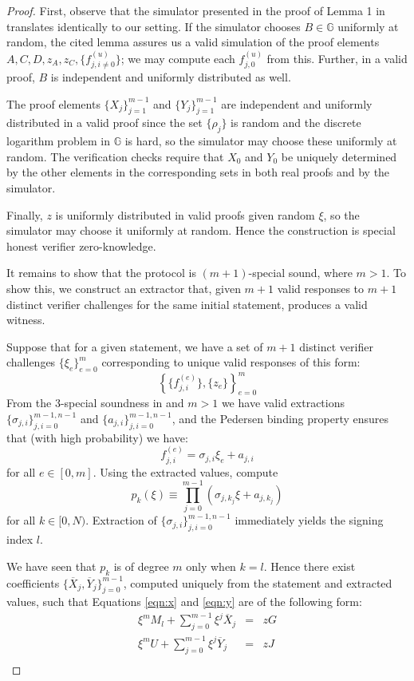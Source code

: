 \documentclass{article}
\newcommand{\G}{\mathbb{G}}
\newcommand{\sumj}{\sum_{j=0}^{m-1}}
\theoremstyle{definition}
\begin{document}
\begin{proof}
First, observe that the simulator presented in the proof of Lemma 1 in \cite{bootle} translates identically to our setting.
If the simulator chooses $B \in \G$ uniformly at random, the cited lemma assures us a valid simulation of the proof elements $A,C,D,z_A,z_C,\{f^{(u)}_{j,i \neq 0}\}$; we may compute each $f^{(u)}_{j,0}$ from this.
Further, in a valid proof, $B$ is independent and uniformly distributed as well.

The proof elements $\{X_j\}_{j=1}^{m-1}$ and $\{Y_j\}_{j=1}^{m-1}$ are independent and uniformly distributed in a valid proof since the set $\{\rho_j\}$ is random and the discrete logarithm problem in $\G$ is hard, so the simulator may choose these uniformly at random.
The verification checks require that $X_0$ and $Y_0$ be uniquely determined by the other elements in the corresponding sets in both real proofs and by the simulator.

Finally, $z$ is uniformly distributed in valid proofs given random $\xi$, so the simulator may choose it uniformly at random.
Hence the construction is special honest verifier zero-knowledge.

It remains to show that the protocol is $(m+1)$-special sound, where $m > 1$.
To show this, we construct an extractor that, given $m+1$ valid responses to $m+1$ distinct verifier challenges for the same initial statement, produces a valid witness.

Suppose that for a given statement, we have a set of $m+1$ distinct verifier challenges $\{\xi_e\}_{e=0}^m$ corresponding to unique valid responses of this form:
$$\left\{ \{f^{(e)}_{j,i}\}, \{z_e\} \right\}_{e=0}^m$$
From the $3$-special soundness in \cite{bootle} and $m > 1$ we have valid extractions $\{\sigma_{j,i}\}_{j,i=0}^{m-1,n-1}$ and $\{a_{j,i}\}_{j,i=0}^{m-1,n-1}$, and the Pedersen binding property ensures that (with high probability) we have:
$$f^{(e)}_{j,i} = \sigma_{j,i}\xi_e + a_{j,i}$$
for all $e \in [0,m]$.
Using the extracted values, compute
$$p_k(\xi) \equiv \prod_{j=0}^{m-1} \left( \sigma_{j,k_j}\xi + a_{j,k_j} \right)$$
for all $k \in [0,N)$.
Extraction of $\{\sigma_{j,i}\}_{j,i=0}^{m-1,n-1}$ immediately yields the signing index $l$.

We have seen that $p_k$ is of degree $m$ only when $k = l$.
Hence there exist coefficients $\{\overline{X}_j,\overline{Y}_j\}_{j=0}^{m-1}$, computed uniquely from the statement and extracted values, such that Equations \ref{eqn:x} and \ref{eqn:y} are of the following form:
\begin{eqnarray*}
\xi^m M_l + \sumj \xi^j\overline{X}_j &=& zG \\
\xi^m U + \sumj \xi^j\overline{Y}_j &=& zJ \\
\end{eqnarray*}


\end{proof}
\end{document}
